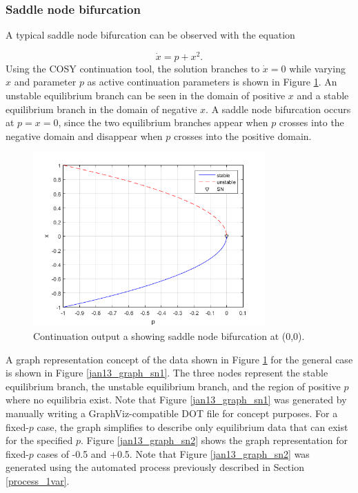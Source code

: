 \documentclass[12pt]{article}
\begin{document}
\subsubsection{Saddle node bifurcation}
A typical saddle node bifurcation can be observed with the equation

\begin{equation}
\dot{x}=p+x^2.
\end{equation}
Using the COSY continuation tool, the solution branches to $\dot{x}=0$ while varying $x$ and parameter $p$ as active continuation parameters is shown in Figure \ref{jan13_bfd_sn1}. An unstable equilibrium branch can be seen in the domain of positive $x$ and a stable equilibrium branch in the domain of negative $x$. A saddle node bifurcation occurs at $p=x=0$, since the two equilibrium branches appear when $p$ crosses into the negative domain and disappear when $p$ crosses into the positive domain.

\begin{figure}[H]
\begin{center}
\includegraphics[width=3.5in]{jan13_bfd_sn1.png}
\caption{Continuation output a showing saddle node bifurcation at (0,0).}
\label{jan13_bfd_sn1}
\end{center}
\end{figure}

A graph representation concept of the data shown in Figure \ref{jan13_bfd_sn1} for the general case is shown in Figure \ref{jan13_graph_sn1}. The three nodes represent the stable equilibrium branch, the unstable equilibrium branch, and the region of positive $p$ where no equilibria exist. Note that Figure \ref{jan13_graph_sn1} was generated by manually writing a GraphViz-compatible DOT file for concept purposes. For a fixed-$p$ case, the graph simplifies to describe only equilibrium data that can exist for the specified $p$. Figure \ref{jan13_graph_sn2} shows the graph representation for fixed-$p$ cases of -0.5 and +0.5. Note that Figure \ref{jan13_graph_sn2} was generated using the automated process previously described in Section \ref{process_1var}.
\end{document}
